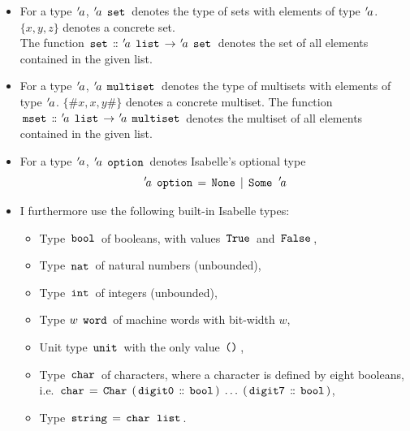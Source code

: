 \begin{itemize}
	      Isabelle/HOL defines the standard higher-order functions $\iexp{map} \dbcolon (\tv{a} \rightarrow \tv{b}) \rightarrow \tv{a} \app \iexp{list} \rightarrow \tv{b} \app \iexp{list}$ and $\iexp{foldl} \dbcolon (\tv{a} \rightarrow \tv{b} \rightarrow \tv{a}) \rightarrow \tv{a} \rightarrow \tv{b} \app \iexp{list} \rightarrow \tv{a}$.
	      A right-fold also exists, but I do not use it in the thesis.
	\item For a type ${\mskip2mu '\mskip-2mua}$, ${\mskip2mu '\mskip-2mua} \; \,\text{\ttfamily set}\,$ denotes the type of sets with elements of type ${\mskip2mu '\mskip-2mua}$.
	      $\{x,y,z\}$ denotes a concrete set.\\
	      The function $\,\text{\ttfamily set}\, \mathrel{\mathord{:}\mkern-1.2mu\mathord{:}} {\mskip2mu '\mskip-2mua} \; \,\text{\ttfamily list}\, \rightarrow {\mskip2mu '\mskip-2mua} \; \,\text{\ttfamily set}\,$ denotes the set of all elements contained in the given list.
	\item For a type ${\mskip2mu '\mskip-2mua}$, ${\mskip2mu '\mskip-2mua} \; \,\text{\ttfamily multiset}\,$ denotes the type of multisets with elements of type ${\mskip2mu '\mskip-2mua}$.
	      $\{\#x,x,y\#\}$ denotes a concrete multiset.
	      The function $\,\text{\ttfamily mset}\, \mathrel{\mathord{:}\mkern-1.2mu\mathord{:}} {\mskip2mu '\mskip-2mua} \; \,\text{\ttfamily list}\, \rightarrow {\mskip2mu '\mskip-2mua} \; \,\text{\ttfamily multiset}\,$ denotes the multiset of all elements contained in the given list.
	\item For a type ${\mskip2mu '\mskip-2mua}$, ${\mskip2mu '\mskip-2mua} \; \,\text{\ttfamily option}\,$ denotes Isabelle's optional type
	      $$
		      {\mskip2mu '\mskip-2mua} \; \,\text{\ttfamily option}\, = \,\text{\ttfamily None}\, \mid \,\text{\ttfamily Some}\, \; {\mskip2mu '\mskip-2mua}
	      $$
	\item I furthermore use the following built-in Isabelle types:
	      \begin{itemize}
		      \item Type $\,\text{\ttfamily bool}\,$ of booleans, with values $\,\text{\ttfamily True}\,$ and $\,\text{\ttfamily False}\,$,
		      \item Type $\,\text{\ttfamily nat}\,$ of natural numbers (unbounded),
		      \item Type $\,\text{\ttfamily int}\,$ of integers (unbounded),
		      \item Type $w \; \,\text{\ttfamily word}\,$ of machine words with bit-width $w$,
		      \item Unit type $\,\text{\ttfamily unit}\,$ with the only value $\,\text{\ttfamily ()}\,$,
		      \item Type $\,\text{\ttfamily char}\,$ of characters, where a character is defined by eight booleans, i.e. $\,\text{\ttfamily char}\, = \,\text{\ttfamily Char}\, \; (\,\text{\ttfamily digit0}\, \mathrel{\mathord{:}\mkern-1.2mu\mathord{:}} \,\text{\ttfamily bool}\,) \; \dots \; (\,\text{\ttfamily digit7}\, \mathrel{\mathord{:}\mkern-1.2mu\mathord{:}} \,\text{\ttfamily bool}\,)$,
		      \item Type $\,\text{\ttfamily string}\, = \,\text{\ttfamily char}\, \; \,\text{\ttfamily list}\,$.
	      \end{itemize}
\end{itemize}

